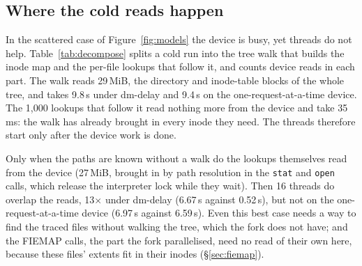 \subsection{Where the cold reads happen}
\label{sec:decompose}

In the scattered case of Figure~\ref{fig:models} the device is busy, yet threads do not
help. Table~\ref{tab:decompose} splits a cold run into the tree walk that builds the
inode map and the per-file lookups that follow it, and counts device reads in each
part. The walk reads 29\,MiB, the directory and inode-table blocks of the whole tree,
and takes 9.8\,s under dm-delay and 9.4\,s on the one-request-at-a-time device. The
1{,}000 lookups that follow it read nothing more from the device and take 35\,ms: the
walk has already brought in every inode they need. The threads therefore start only
after the device work is done.

Only when the paths are known without a walk do the lookups themselves read from the
device (27\,MiB, brought in by path resolution in the \texttt{stat} and \texttt{open}
calls, which release the interpreter lock while they wait). Then 16 threads do overlap
the reads, 13$\times$ under dm-delay (6.67\,s against 0.52\,s), but not on the
one-request-at-a-time device (6.97\,s against 6.59\,s). Even this best case needs a way
to find the traced files without walking the tree, which the fork does not have; and
the FIEMAP calls, the part the fork parallelised, need no read of their own here,
because these files' extents fit in their inodes (\S\ref{sec:fiemap}).

\begin{table}[t]
\centering
\caption{A cold run of the scattered case split into the inode-map walk and the
per-file lookups (5\,ms configured delay), and the lookups alone when the paths are
already known. Medians of five runs.}
\label{tab:decompose}
\small
{}
\end{table}
